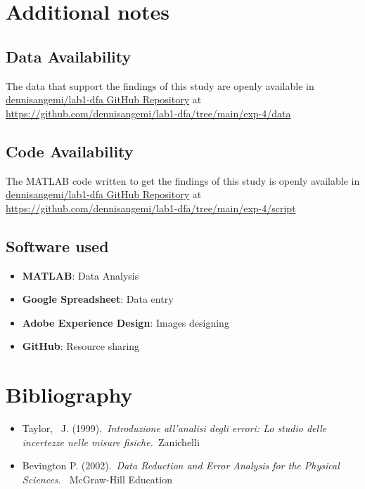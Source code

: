 \documentclass[10pt,a4paper]{article}
\begin{document}
\section{Additional notes}

\subsection{Data Availability}
The data that support the findings of this study are openly available in \href{https://github.com/dennisangemi/lab1-dfa/tree/main/exp-4/data}{dennisangemi/lab1-dfa GitHub Repository} at \href{https://github.com/dennisangemi/lab1-dfa/tree/main/exp-4/data}{https://github.com/dennisangemi/lab1-dfa/tree/main/exp-4/data}

\subsection{Code Availability}
The MATLAB code written to get the findings of this study is openly available in \href{https://github.com/dennisangemi/lab1-dfa/tree/main/exp-2/script}{dennisangemi/lab1-dfa GitHub Repository} at \href{https://github.com/dennisangemi/lab1-dfa/tree/main/exp-4/script}{https://github.com/dennisangemi/lab1-dfa/tree/main/exp-4/script}


\subsection{Software used}
\begin{itemize}
\item
  \textbf{MATLAB}: Data Analysis
\item
  \textbf{Google Spreadsheet}: Data entry
\item
  \textbf{Adobe Experience Design}: Images designing
\item
  \textbf{GitHub}: Resource sharing
\end{itemize}

\section{Bibliography}
\begin{itemize}
\item
  Taylor,~ J. (1999).~\emph{Introduzione all'analisi degli errori: Lo
  studio delle incertezze nelle misure fisiche.~}Zanichelli
\item
  Bevington P. (2002).~\emph{Data Reduction and Error Analysis for the
  Physical Sciences.~} McGraw-Hill Education ~
\end{itemize}
\end{document}
